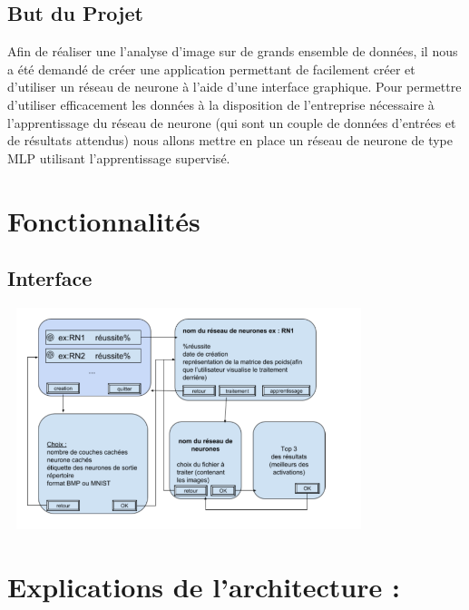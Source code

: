 \documentclass{article}
\begin{document}
	\subsection{But du Projet}
		Afin de réaliser une l'analyse d'image sur de grands ensemble de données, il nous a été demandé de créer une application permettant de facilement créer et d'utiliser un réseau de neurone à l'aide d'une interface graphique. Pour permettre d'utiliser efficacement les données à la disposition de l'entreprise nécessaire à l'apprentissage du réseau de neurone (qui sont un couple de données d'entrées et de résultats attendus) nous allons mettre en place un réseau de neurone de type MLP utilisant l'apprentissage supervisé.

\section{Fonctionnalités}
\subsection{Interface}
			\begin{center} 
				\includegraphics[height=244, width=400]{interface.png}
			\end{center}
			
\section{Explications de l'architecture :}
\end{document}
